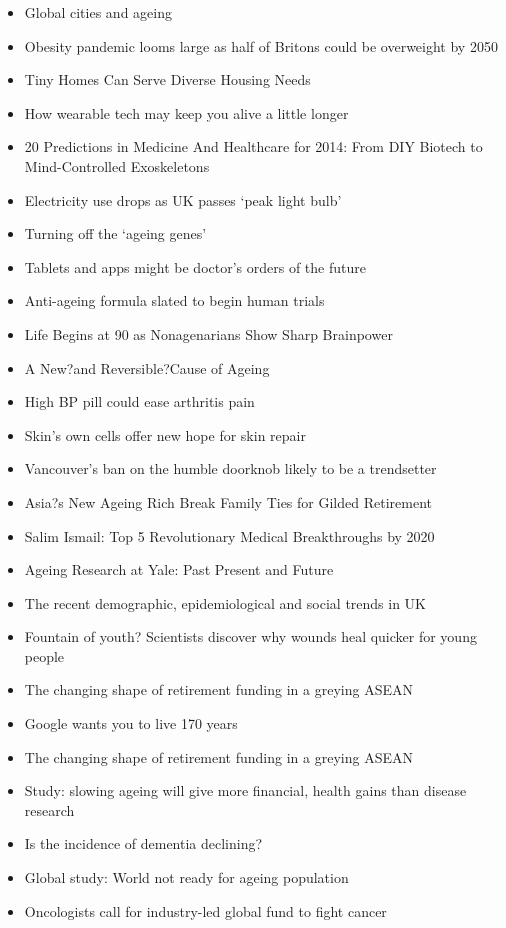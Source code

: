 \begin{itemize}
	\item Global cities and ageing
	\item Obesity pandemic looms large as half of Britons could be overweight by 2050
	\item Tiny Homes Can Serve Diverse Housing Needs
	\item How wearable tech may keep you alive a little longer
	\item 20 Predictions in Medicine And Healthcare for 2014: From DIY Biotech to Mind-Controlled Exoskeletons
	\item Electricity use drops as UK passes `peak light bulb'
	\item Turning off the `ageing genes'
	\item Tablets and apps might be doctor's orders of the future
	\item Anti-ageing formula slated to begin human trials
	\item Life Begins at 90 as Nonagenarians Show Sharp Brainpower
	\item A New?and Reversible?Cause of Ageing
	\item High BP pill could ease arthritis pain
	\item Skin's own cells offer new hope for skin repair
	\item Vancouver's ban on the humble doorknob likely to be a trendsetter
	\item Asia?s New Ageing Rich Break Family Ties for Gilded Retirement
	\item Salim Ismail: Top 5 Revolutionary Medical Breakthroughs by 2020
	\item Ageing Research at Yale: Past Present and Future
	\item The recent demographic, epidemiological and social trends in UK
	\item Fountain of youth? Scientists discover why wounds heal quicker for young people
	\item The changing shape of retirement funding in a greying ASEAN
	\item Google wants you to live 170 years
	\item The changing shape of retirement funding in a greying ASEAN
	\item Study: slowing ageing will give more financial, health gains than disease research
	\item Is the incidence of dementia declining?
	\item Global study: World not ready for ageing population
	\item Oncologists call for industry-led global fund to fight cancer

\end{itemize}
